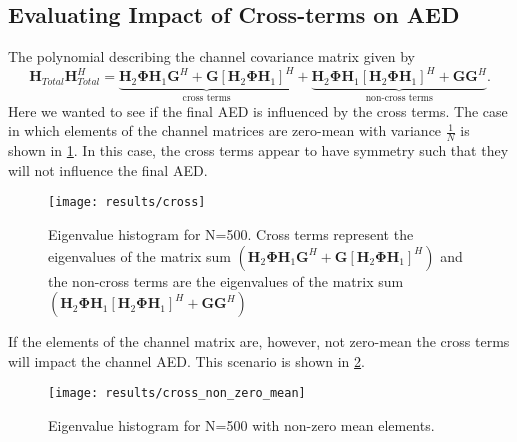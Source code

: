 \documentclass[12pt,a4paper]{report}
\begin{document}
\subsection{Evaluating Impact of Cross-terms on AED}\label{cross_terms}
The polynomial describing the channel
covariance matrix given by 
\begin{equation}
\mathbf{H}_{Total}\mathbf{H}_{Total}^H = 
\underbrace{
\mathbf{H}_{2}\boldsymbol{\Phi}\mathbf{H}_{1}\mathbf{G}^H + \mathbf{G}[\mathbf{H}_{2}\boldsymbol{\Phi}\mathbf{H}_{1}]^H}_{\text{cross terms}}
+ 
\underbrace{
\mathbf{H}_{2}\boldsymbol{\Phi}\mathbf{H}_{1}[\mathbf{H}_{2}\boldsymbol{\Phi}\mathbf{H}_{1}]^H + \mathbf{G}\mathbf{G}^H}_{\text{non-cross terms}}.
\end{equation} 
Here we wanted to see if the final AED is influenced by the cross terms. The case in which elements of the channel matrices are zero-mean with variance  $\frac{1}{N}$ is shown in \ref{cross}. In this case, the cross terms appear to have symmetry such that they will not influence the final AED.

\begin{figure}[H]
	\texttt{[image: results/cross]}
\caption{Eigenvalue histogram for N=500. Cross terms represent the eigenvalues of the matrix sum $(\mathbf{H}_{2}\boldsymbol{\Phi}\mathbf{H}_{1}\mathbf{G}^H + \mathbf{G}[\mathbf{H}_{2}\boldsymbol{\Phi}\mathbf{H}_{1}]^H)$ and the non-cross terms are the eigenvalues of the matrix sum $(\mathbf{H}_{2}\boldsymbol{\Phi}\mathbf{H}_{1}[\mathbf{H}_{2}\boldsymbol{\Phi}\mathbf{H}_{1}]^H + \mathbf{G}\mathbf{G}^H)$}
\label{cross}
\end{figure}

If the elements of the channel matrix are, however, not zero-mean the cross terms will impact the channel AED. 
This scenario is shown in \ref{cross_non_zero_mean}.

\begin{figure}[H]
	\texttt{[image: results/cross\_non\_zero\_mean]}
\caption{Eigenvalue histogram for N=500 with non-zero mean elements.}
\label{cross_non_zero_mean}
\end{figure}
\end{document}
